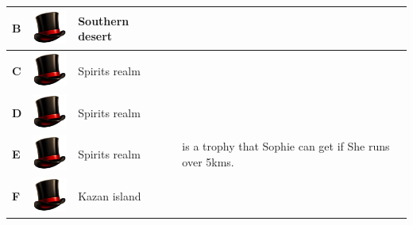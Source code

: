 \begin{longtable}[H]{|p{2cm}|p{1.5cm}|p{2cm}|p{2.8cm}|p{6.3cm}|}
\textbf{B}                           & \includegraphics[width=1.4cm]{Images/Hats/magic}              & Southern desert                                                &                                                                                       &                                                                                                                                        \\ \hline
\textbf{C}                           & \includegraphics[width=1.4cm]{Images/Hats/magic}              & Spirits realm                                                  &                                                                                       &                                                                                                                                        \\ \hline
\textbf{D}                           & \includegraphics[width=1.4cm]{Images/Hats/magic}              & Spirits realm                                                  &                                                                                       &                                                                                                                                        \\ \hline
\textbf{E}                           & \includegraphics[width=1.4cm]{Images/Hats/magic}              & Spirits realm                                                  &                                                                                       & is a trophy that Sophie can get if She runs over 5kms.                                                                                 \\ \hline
\textbf{F}                           & \includegraphics[width=1.4cm]{Images/Hats/magic}              & Kazan island                                                   &                                                                                       &                                                                                                                                        \\ \hline

\end{longtable}
